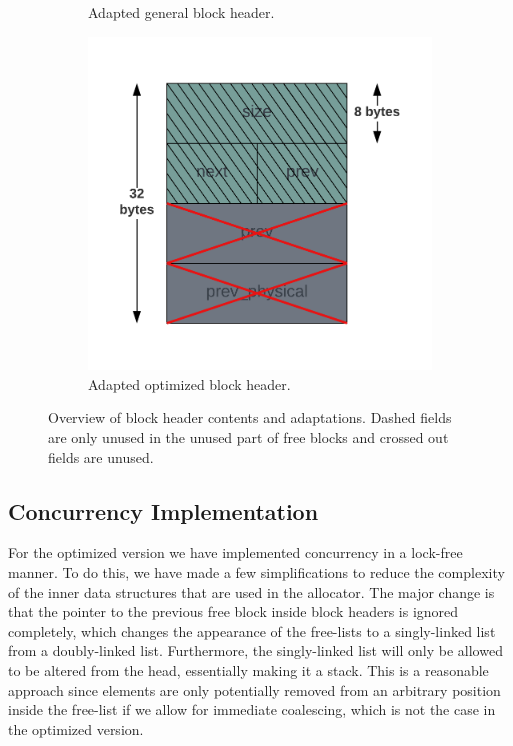 \begin{figure}[H]
\begin{subfigure}[b]{0.3\textwidth}
        \caption{Adapted general block header.}
        \label{fig:blockheader_adap_general}
    \end{subfigure}%
    \hfill
    \begin{subfigure}[b]{0.3\textwidth}
        \centering
        \includegraphics[width=\textwidth]{figures/blockheader_adap_optimized.png}
        \caption{Adapted optimized block header.}
        \label{fig:blockheader_adap_optimized}
    \end{subfigure}
    \caption{Overview of block header contents and adaptations. Dashed fields are only unused in the unused part of free blocks and crossed out fields are unused.}
    \label{fig:blockheader_adaptations}
\end{figure}

\subsection{Concurrency Implementation}

For the optimized version we have implemented concurrency in a lock-free manner. To do this, we have made a few simplifications to reduce the complexity of the inner data structures that are used in the allocator. The major change is that the pointer to the previous free block inside block headers is ignored completely, which changes the appearance of the free-lists to a singly-linked list from a doubly-linked list. Furthermore, the singly-linked list will only be allowed to be altered from the head, essentially making it a stack. This is a reasonable approach since elements are only potentially removed from an arbitrary position inside the free-list if we allow for immediate coalescing, which is not the case in the optimized version.

